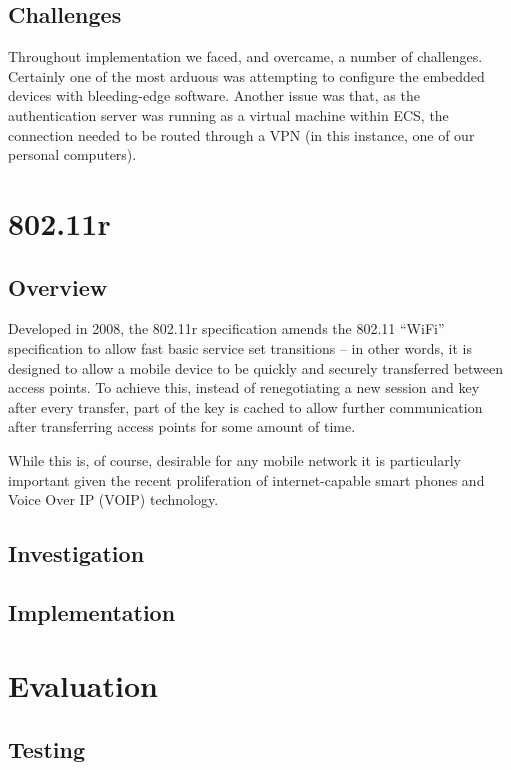 \documentclass[12pt,a4paper,titlepage]{article}
\begin{document}
\subsection{Challenges}
Throughout implementation we faced, and overcame, a number of challenges. Certainly one of the most arduous was attempting to configure the embedded devices with bleeding-edge software. Another issue was that, as the authentication server was running as a virtual machine within ECS, the connection needed to be routed through a VPN (in this instance, one of our personal computers).

\newpage
\section{802.11r}

\subsection{Overview}
Developed in 2008, the 802.11r specification amends the 802.11 ``WiFi'' specification to allow fast basic service set transitions -- in other words, it is designed to allow a mobile device to be quickly and securely transferred between access points. To achieve this, instead of renegotiating a new session and key after every transfer, part of the key is cached to allow further communication after transferring access points for some amount of time.

While this is, of course, desirable for any mobile network it is particularly important given the recent proliferation of internet-capable smart phones and Voice Over IP (VOIP) technology.

\subsection{Investigation}

\subsection{Implementation}

\newpage
\section{Evaluation}

\subsection{Testing}
\end{document}
